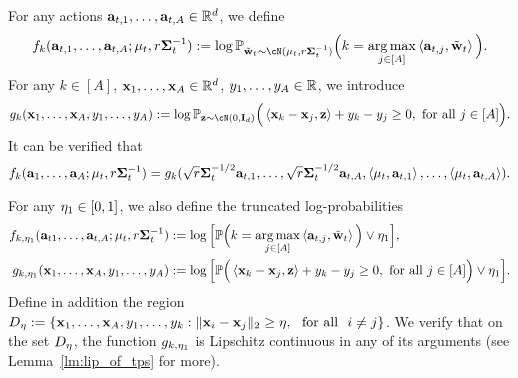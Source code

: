 For any actions ${\mathbf a}_{t,1},\ldots,{\mathbf a}_{t,A}\in\mathbb{R}^{d}$, we define 
\begin{align*}
f_k(\ba_{t,1},\ldots,\ba_{t,A};\Tpsmean_t,\Tpsparn\Tpscov_t^{-1}):=\log\P_{\Tpssam_t\sim\cN(\Tpsmean_t,\Tpsparn\Tpscov_t^{-1})}\Big(k =\argmax_{j\in[A]}\<\ba_{t,j},\Tpssam_t\>\Big). 
\end{align*}  
For any $k\in[A]$, ${\mathbf x}_1,\ldots,{\mathbf x}_A\in\mathbb{R}^{d}$, $y_1,\ldots,y_A\in\mathbb{R}$, we introduce $$
g_k(\bx_1,\ldots,\bx_A,y_1,\ldots,y_A):=\log\P_{\bz\sim\cN(0,\id_d)} \Big(\<\bx_k-\bx_j,\bz\>+y_k-y_j\geq0,\text{~for all~}j\in[A] \Big). 
$$
It can be verified that $$f_k({\mathbf a}_1,\ldots,{\mathbf a}_A;{{\mathbf\mu}}_t,{r}{{\mathbf\Sigma}}_t^{-1})=g_k(\sqrt{{r}}{{\mathbf\Sigma}}_t^{-1/2}{\mathbf a}_{t,1},\ldots,\sqrt{{r}}{{\mathbf\Sigma}}_t^{-1/2}{\mathbf a}_{t,A},\left\langle{{\mathbf\mu}}_t,{\mathbf a}_{t,1}\right\rangle,\ldots,\left\langle{{\mathbf\mu}}_t,{\mathbf a}_{t,A}\right\rangle).$$  

For any ${\eta_1}\in[0,1]$, we also define the truncated log-probabilities
\begin{align*}
f_{k,{\eta_1}}({\mathbf a}_{t1},\ldots,{\mathbf a}_{t,A};{{\mathbf\mu}}_t,{r}{{\mathbf\Sigma}}_t^{-1})&:=\log\Big[\mathbb{P} \Big( k =\operatorname*{arg\,max}_{j \in[A]}\left\langle{\mathbf a}_{t,j},{\tilde{{\mathbf w}}}_t\right\rangle \Big)\vee{\eta_1} \Big],\\
g_{k,{\eta_1}}({\mathbf x}_1,\ldots,{\mathbf x}_A,y_1,\ldots,y_A)&:=\log \Big[ \mathbb{P} \Big(\left\langle{\mathbf x}_k-{\mathbf x}_j,{\mathbf z}\right\rangle+y_k-y_j\geq0,\text{~for all~}j\in[A] \Big) \vee {\eta_1} \Big].
\end{align*}
Define in addition the region ${D}_{{\eta}}:=\{{\mathbf x}_1,\ldots,{\mathbf x}_A,y_1,\ldots,y_k: \|{\mathbf x}_i-{\mathbf x}_j\|_2\geq{\eta},~~\text{for all~~} i\neq j\}$. We verify that on the set ${D}_{\eta}$, the function $g_{k,{\eta_1}}$ is Lipschitz continuous in any of its arguments (see Lemma~\ref{lm:lip_of_tps} for more).
 
